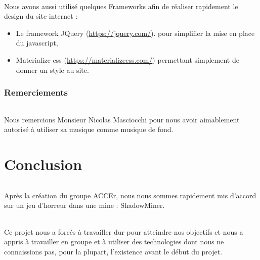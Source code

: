\documentclass[titlepage, 13px, a4paper]{report}
\begin{document}
\paragraph*{} \hspace{0pt}
Nous avons aussi utilisé quelques Frameworks  afin de réaliser rapidement le design du site internet :
{\begin{itemize}
	\item Le framework JQuery (\url{https://jquery.com/}). pour simplifier la mise en place du javascript,
	\item Materialize css (\url{https://materializecss.com/}) permettant simplement de donner un style au site. \\
\end{itemize}}

\section{Remerciements}
\paragraph*{} \hspace{0pt}
Nous remercions Monsieur Nicolas Masciocchi pour nous avoir aimablement autorisé à utiliser sa musique 
comme musique de fond. \\


\newpage


\part{Conclusion}
\paragraph*{} \hspace{0pt}
Après la création du groupe ACCEr, nous nous sommes rapidement mis d’accord sur un jeu 
d’horreur dans une mine : ShadowMiner. \\

\paragraph*{} \hspace{0pt}
Ce projet nous a forcés à travailler dur pour atteindre nos objectifs et nous a appris à 
travailler en groupe et à utiliser des technologies dont nous ne connaissions pas, pour la 
plupart, l’existence avant le début du projet. \\
\end{document}
